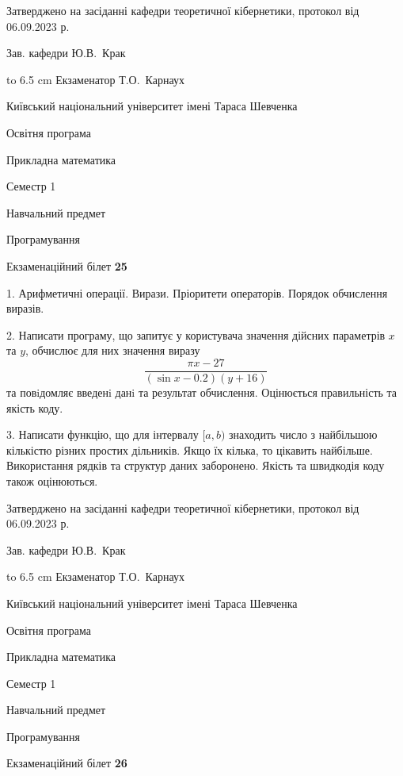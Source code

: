 \documentclass[12pt, ukrainian]{article}
\begin{document}
{\smallskip\smallskip \begin {scriptsize} Затверджено на засіданні кафедри теоретичної кібернетики, протокол   від   06.09.2023 р.\par\smallskip\smallskip\smallskip\smallskip
{\parbox {6.5 cm} {Зав. кафедри \dotfill Ю.В.~Крак}}\hspace {0.7cm} {\hbox to 6.5 cm { Екзаменатор \dotfill Т.О.~Карнаух}} \end{scriptsize}}
\newpage
{{\begin {scriptsize}\par
{ \center  Київський національний університет імені Тараса Шевченка \par}
{\parbox {5 cm}{Освітня програма \hfill}{\parbox {7 cm}{Прикладна математика\hfill}}\parbox {6 cm}{\hfill Семестр 1}}\par
{\parbox {5 cm} {Навчальний предмет \hfill}\parbox {7 cm}{Програмування \hfill}\parbox {6cm}{\hfill}\par}\vspace{-15pt} \end{scriptsize}}{\center Екзаменаційний білет \No \textbf { 25 }\par}}
{%
1. Арифметичні операції. Вирази. Пріоритети операторів. Порядок обчислення виразів.%
\par
2. Написати програму, що запитує у користувача значення дійсних параметрів $x$ та $y$, обчислює для них значення виразу 
$$\frac{\pi x - 27}{(\sin x - 0.2) (y + 16)}$$ 
та повiдомляє введенi данi та результат обчислення.
 Оцінюється правильність та якість коду.

\par
3. Написати функцію, що для інтервалу $[a, b)$ знаходить число з найбільшою кількістю різних простих дільників. Якщо їх кілька, то цікавить найбільше.  Використання рядків та структур даних заборонено. Якість та швидкодія коду також оцінюються. 

}
{\smallskip\smallskip \begin {scriptsize} Затверджено на засіданні кафедри теоретичної кібернетики, протокол   від   06.09.2023 р.\par\smallskip\smallskip\smallskip\smallskip
{\parbox {6.5 cm} {Зав. кафедри \dotfill Ю.В.~Крак}}\hspace {0.7cm} {\hbox to 6.5 cm { Екзаменатор \dotfill Т.О.~Карнаух}} \end{scriptsize}}
\vspace{0.9cm}
{{\begin {scriptsize}\par
{ \center  Київський національний університет імені Тараса Шевченка \par}
{\parbox {5 cm}{Освітня програма \hfill}{\parbox {7 cm}{Прикладна математика\hfill}}\parbox {6 cm}{\hfill Семестр 1}}\par
{\parbox {5 cm} {Навчальний предмет \hfill}\parbox {7 cm}{Програмування \hfill}\parbox {6cm}{\hfill}\par}\vspace{-15pt} \end{scriptsize}}{\center Екзаменаційний білет \No \textbf { 26 }\par}}
\end{document}

